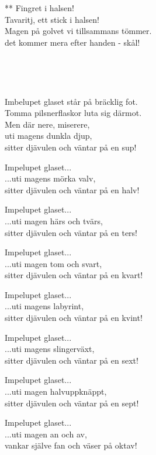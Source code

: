 **
Fingret i halsen!\\
Tavaritj, ett stick i halsen!\\
Magen på golvet vi tillsammans tömmer.\\
det kommer mera efter handen - skål!

 \\

\newpage


 \\       

\songtext{}
Imbelupet glaset står på bräcklig fot.\\
Tomma pilsnerflaskor luta sig därmot.\\
Men där nere, miserere,\\
uti magens dunkla djup,\\
sitter djävulen och väntar på en sup!

Impelupet glaset...\\
...uti magens mörka valv,\\
sitter djävulen och väntar på en halv!

Impelupet glaset...\\
...uti magen härs och tvärs,\\
sitter djävulen och väntar på en ters!

Impelupet glaset...\\
...uti magen tom och svart,\\
sitter djävulen och väntar på en kvart!

Impelupet glaset...\\
...uti magens labyrint,\\
sitter djävulen och väntar på en kvint!

Impelupet glaset...\\
...uti magens slingerväxt,\\
sitter djävulen och väntar på en sext!

Impelupet glaset...\\
...uti magen halvuppknäppt,\\
sitter djävulen och väntar på en sept!

Impelupet glaset...\\
...uti magen an och av,\\
vankar själve fan och väser på oktav!

